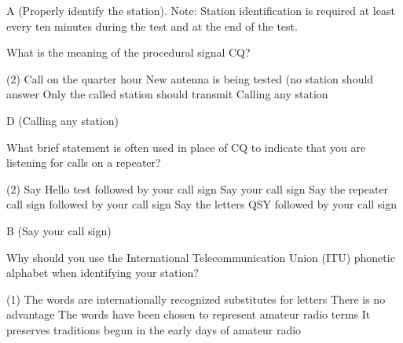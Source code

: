 \documentclass[a4paper]{article}
\begin{document}
\begin{solution}
	A (Properly identify the station). Note: Station identification is required at least every ten minutes during the test and at the end of the test.
\end{solution}

\vspace{5mm}



\begin{question}What is the meaning of the procedural signal \apostrophe{}CQ\apostrophe{}?
	\begin{tasks}(2)
		\task Call on the quarter hour
		\task New antenna is being tested (no station should answer
		\task Only the called station should transmit
		\task Calling any station
	\end{tasks}
\end{question}

\begin{solution}
	D (Calling any station)
\end{solution}

\vspace{5mm}


\begin{question}What brief statement is often used in place of \apostrophe{}CQ\apostrophe{} to indicate that you are listening for calls on a repeater?
	\begin{tasks}(2)
		\task Say \apostrophe{}Hello test\apostrophe{} followed by your call sign
		\task Say your call sign
		\task Say the repeater call sign followed by your call sign
		\task Say the letters \apostrophe{}QSY\apostrophe{} followed by your call sign
	\end{tasks}
\end{question}

\begin{solution}
	B (Say your call sign)
\end{solution}

\vspace{5mm}



\begin{question}Why should you use the International Telecommunication Union (ITU) phonetic alphabet when identifying your station?
	\begin{tasks}(1)
		\task The words are internationally recognized substitutes for letters
		\task There is no advantage
		\task The words have been chosen to represent amateur radio terms
		\task It preserves traditions begun in the early days of amateur radio
	\end{tasks}
\end{question}
\end{document}
